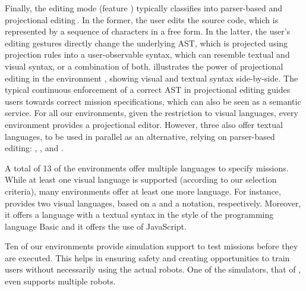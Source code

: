 Finally, the editing mode (feature \feditingmode) typically classifies into parser-based and projectional editing\,\cite{voelter2014projectional,berger2016pe}. In the former, the user edits the source code, which is represented by a sequence of characters in a free form. In the latter, the user's editing gestures directly change the underlying AST, which is projected using projection rules into a user-observable syntax, which can resemble textual and visual syntax, or a combination of both.  illustrates the power of projectional editing in the environment \easyc, showing visual and textual syntax side-by-side. The typical continuous enforcement of a correct AST in projectional editing guides users towards correct mission specifications, which can also be seen as a semantic service. For all our environments, given the restriction to visual languages, every environment provides a projectional editor. However, three also offer textual languages, to be used in parallel as an alternative, relying on parser-based editing: \aseba, \vex, and \turtlebot.%

 A total of 13 of the environments offer multiple languages to specify missions. While at least one visual language is supported (according to our selection criteria), many environments offer at least one more language. For instance, \picaxe provides two visual languages, based on a \fflowchart and a \fblockly notation, respectively. Moreover, it offers a language with a textual syntax in the style of the programming language Basic and it offers the use of JavaScript.



 Ten of our environments provide simulation support to test missions before they are executed. This helps in ensuring safety and creating opportunities to train users without necessarily using the actual robots. One of the simulators, that of \missionlab, even supports multiple robots.

